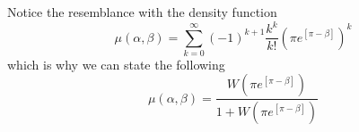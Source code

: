 \documentclass{article}
\newcommand{\ppar}[1]{\left( #1 \right)}
\newcommand{\spar}[1]{\left[ #1 \right]}
\begin{document}
Notice the resemblance with the density function
\begin{equation}
    \mu(\alpha, \beta) =
    \sum_{k=0}^{\infty}
    (-1)^{k+1} \frac{k^k}{k!} 
    \ppar{\pi e^{\spar{\pi-\beta}} }^k
\end{equation}
which is why we can state the following
\begin{equation}
    \mu(\alpha, \beta) =
    \frac{W\ppar{\pi e^{\spar{\pi-\beta}}}}{1+W\ppar{\pi e^{\spar{\pi-\beta}}}}
\end{equation}



\end{document}
